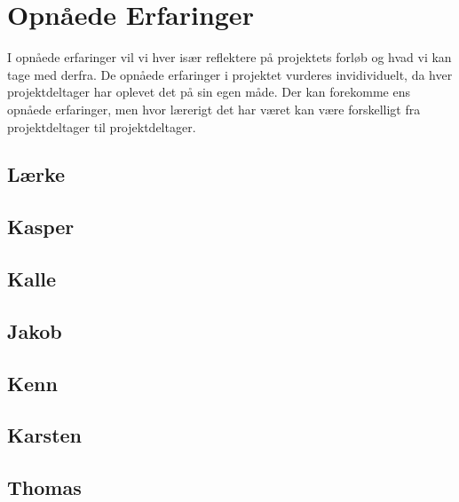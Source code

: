 \section{Opnåede Erfaringer}
I opnåede erfaringer vil vi hver især reflektere på projektets forløb og hvad vi kan tage med derfra. De opnåede erfaringer i projektet vurderes invidividuelt, da hver projektdeltager har oplevet det på sin egen måde. Der kan forekomme ens opnåede erfaringer, men hvor lærerigt det har været kan være forskelligt fra projektdeltager til projektdeltager.

\subsection{Lærke}


\subsection{Kasper}


\subsection{Kalle}


\subsection{Jakob}


\subsection{Kenn}


\subsection{Karsten}


\subsection{Thomas}
